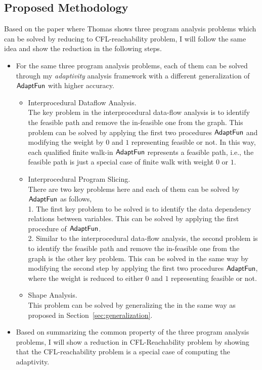 \subsection{Proposed Methodology}
\label{subsec:cfl-methodology}
Based on the paper\cite{Reps98} where Thomas shows 
three program analysis problems 
which can be solved by reducing to CFL-reachability problem, I will follow the same idea and show the reduction
in the following steps.
\begin{itemize}
 \item For the same three program analysis problems, each of them 
 can be solved through my \emph{adaptivity} analysis framework with 
 a different generalization of $\textsf{AdaptFun}$ with higher accuracy.
 \begin{itemize}
 \item Interprocedural Dataflow Analysis.
 \\
 The key problem in the interprocedural data-flow analysis is to identify the feasible path and remove 
 the in-feasible one from the graph.
 This problem can be solved by applying the first two procedures $\textsf{AdaptFun}$ and modifying the weight
 by $0$ and $1$ representing feasible or not. In this way, each qualified finite walk-in 
 $\textsf{AdaptFun}$ represents a feasible path, i.e., the feasible path is just a special case of finite walk 
 with weight $0$ or $1$.
 \item Interprocedural Program Slicing.
 \\
 There are two key problems here and each of them can be solved by $\textsf{AdaptFun}$ as follows,
 \\ 
 1. The first key problem to be solved is to identify the data dependency relations between variables. 
 This can be solved by applying the first procedure of $\textsf{AdaptFun}$.
 \\
 2. Similar to the interprocedural data-flow analysis, the second problem is to identify the feasible path and remove 
 the in-feasible one from the graph is the other key problem. 
 This can be solved in the same way by modifying the second step by applying the first two procedures $\textsf{AdaptFun}$,
 where the weight is reduced to either $0$ and $1$ representing feasible or not.
 \item Shape Analysis.
 \\
 This problem can be solved by generalizing the in the same way as proposed in Section~\ref{sec:generalization}.
 \end{itemize}
 \item Based on summarizing the common property of the three program analysis problems,
 I will show a reduction in CFL-Reachability problem 
 by showing that the CFL-reachability problem is a special case of 
 computing the adaptivity. 
\end{itemize}
